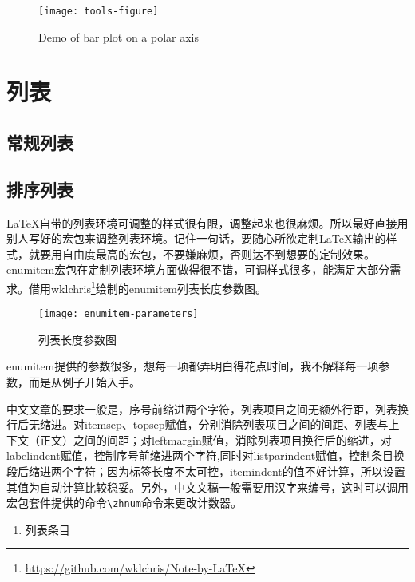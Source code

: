 \begin{figure}[!htb]
    \begin{center}
        \texttt{[image: tools-figure]}
        \caption{Demo of bar plot on a polar axis}
        \label{tools-figure}
    \end{center}
\end{figure}

\section{列表}

\subsection{常规列表}

\subsection{排序列表}

\LaTeX 自带的列表环境可调整的样式很有限，调整起来也很麻烦。所以最好直接用别人写好的宏包来调整列表环境。记住一句话，要随心所欲定制\LaTeX 输出的样式，就要用自由度最高的宏包，不要嫌麻烦，否则达不到想要的定制效果。enumitem宏包在定制列表环境方面做得很不错，可调样式很多，能满足大部分需求。借用wklchris\footnote{\url{https://github.com/wklchris/Note-by-LaTeX}}绘制的enumitem列表长度参数图。

\begin{figure}[!htb]
    \centering
    \texttt{[image: enumitem-parameters]}
    \caption{列表长度参数图}
\end{figure}

enumitem提供的参数很多，想每一项都弄明白得花点时间，我不解释每一项参数，而是从例子开始入手。

中文文章的要求一般是，序号前缩进两个字符，列表项目之间无额外行距，列表换行后无缩进。对itemsep、topsep赋值，分别消除列表项目之间的间距、列表与上下文（正文）之间的间距；对leftmargin赋值，消除列表项目换行后的缩进，对labelindent赋值，控制序号前缩进两个字符,同时对listparindent赋值，控制条目换段后缩进两个字符；因为标签长度不太可控，itemindent的值不好计算，所以设置其值为自动计算比较稳妥。另外，中文文稿一般需要用汉字来编号，这时可以调用\CTeX{}宏包套件提供的命令\lstinline|\zhnum|命令来更改计数器。

\begin{latex}
\begin{enumerate}[label=(\zhnum*),itemsep=0pt,parsep=0pt,topsep=0pt,leftmargin=0pt,labelindent=\parindent,listparindent=\parindent,itemindent=*]
\item 列表条目
\end{enumerate}
\end{latex}

